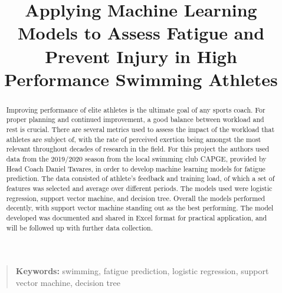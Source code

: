\documentclass[conference]{IEEEtran}
\begin{document}
\title{Applying Machine Learning Models to Assess Fatigue and Prevent Injury in High Performance Swimming Athletes}

\author{
\and
{}
}


\maketitle
\thispagestyle{plain}


\begin{abstract}
Improving performance of elite athletes is the ultimate goal of any sports coach. For proper planning and continued improvement, a good balance between workload and rest is crucial. There are several metrics used to assess the impact of the workload that athletes are subject of, with the rate of perceived exertion being amongst the most relevant throughout decades of research in the field. 
For this project the authors used data from the 2019/2020 season from the local swimming club CAPGE, provided by Head Coach Daniel Tavares, in order to develop machine learning models for fatigue prediction. The data consisted of athlete's feedback and training load, of which a set of features was selected and average over different periods. The models used were logistic regression, support vector machine, and decision tree. Overall the models performed decently, with support vector machine standing out as the best performing. 
The model developed was documented and shared in Excel format for practical application, and will be followed up with further data collection.
\end{abstract}

\begin{quote}
\small
\noindent
\textbf{Keywords:} swimming, fatigue prediction, logistic regression, support vector machine, decision tree
\end{quote}
\end{document}
